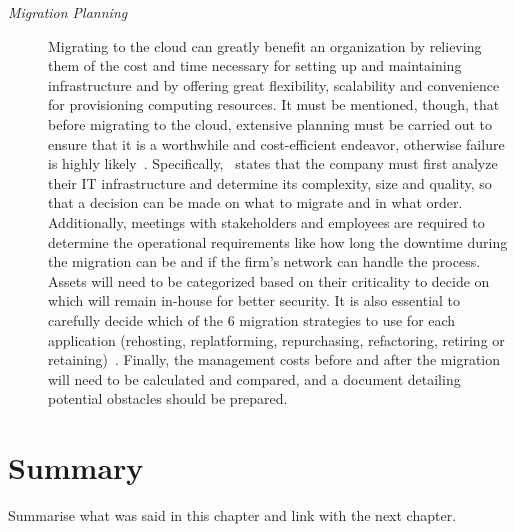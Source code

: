\begin{description}
    \item[\textit{Migration Planning}] Migrating to the cloud can greatly benefit an organization by relieving them of the cost and time necessary for setting up and maintaining infrastructure and by offering great flexibility, scalability and convenience for provisioning computing resources. It must be mentioned, though, that before migrating to the cloud, extensive planning must be carried out to ensure that it is a worthwhile and cost-efficient endeavor, otherwise failure is highly likely~\cite{cloud-failure}. Specifically,~\cite{migration-planning} states that the company must first analyze their IT infrastructure and determine its complexity, size and quality, so that a decision can be made on what to migrate and in what order. Additionally, meetings with stakeholders and employees are required to determine the operational requirements like how long the downtime during the migration can be and if the firm's network can handle the process. Assets will need to be categorized based on their criticality to decide on which will remain in-house for better security. It is also essential to carefully decide which of the 6 migration strategies to use for each application (rehosting, replatforming, repurchasing, refactoring, retiring or retaining)~\cite{6rs}. Finally, the management costs before and after the migration will need to be calculated and compared, and a document detailing potential obstacles should be prepared.

\end{description}


\section{Summary}
Summarise what was said in this chapter and link with the next chapter.
